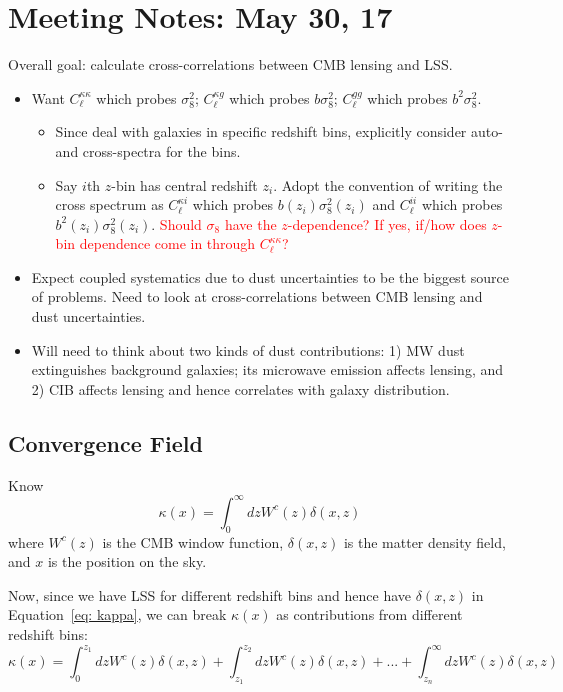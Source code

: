 \documentclass{article}
\newcommand{\eq}[1]{\begin{equation}{#1}\end{equation}}
\newcommand{\clred}[1]{\textcolor{red}{#1}}
\begin{document}
\large{
\section*{Meeting Notes: May 30, 17}
Overall goal: calculate cross-correlations between CMB lensing and LSS.
\begin{itemize}
\item Want $C_\ell^{\kappa\kappa}$ which probes $\sigma_8^2$; $C_\ell^{\kappa g}$ which probes $b\sigma_8^2$; $C_\ell^{gg}$ which probes $b^2\sigma_8^2$.
	\begin{itemize}
	\item Since deal with galaxies in specific redshift bins, explicitly consider auto- and cross-spectra for the bins.
	\item Say $i$th $z$-bin has central redshift $z_i$. Adopt the convention of writing the cross spectrum as $C_\ell^{\kappa i}$ which probes $b(z_i) \sigma_8^2(z_i)$ and $C_\ell^{ii}$ which probes $b^2(z_i)\sigma_8^2(z_i)$. \clred{Should $\sigma_8$ have the $z$-dependence? If yes, if/how does $z$-bin dependence come in through $C_\ell^{\kappa\kappa}$?}
	\end{itemize}
\item Expect coupled systematics due to dust uncertainties to be the biggest source of problems. Need to look at cross-correlations between CMB lensing and dust uncertainties.
\item Will need to think about two kinds of dust contributions: 1) MW dust extinguishes background galaxies; its microwave emission affects lensing, and 2) CIB affects lensing and hence correlates with galaxy distribution.
\end{itemize}

\subsection*{Convergence Field}
Know
\eq{\kappa(x)= \int_0^\infty dz W^c(z)\delta(x,z) \label{eq: kappa}}
where $W^c(z)$ is the CMB window function, $\delta(x,z)$ is the matter density field, and $x$ is the position on the sky.

Now, since we have LSS for different redshift bins and hence have $\delta(x, z)$ in Equation~\ref{eq: kappa}, we can break $\kappa(x)$ as contributions from different redshift bins:
\eq{\kappa(x)= \int_0^{z_1} dz W^c(z)\delta(x,z) + \int_{z_1}^{z_2} dz W^c(z)\delta(x,z) + ... + \int_{z_n}^\infty dz W^c(z)\delta(x,z) \label{eq: kappa break}}

}
\end{document}
